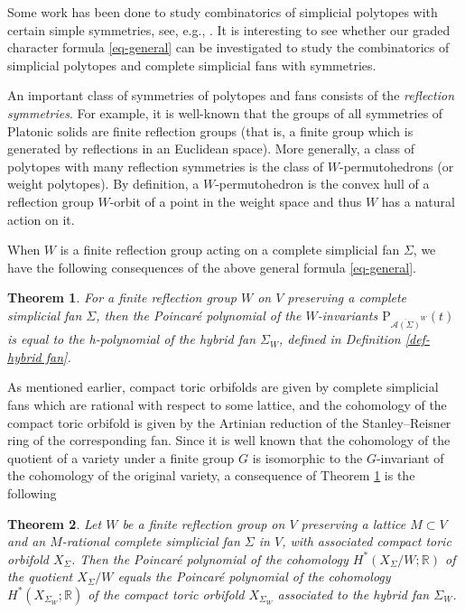\documentclass{amsart}
\newtheorem{theorem}{Theorem}[section]
\theoremstyle{definition}
\theoremstyle{remark}
\numberwithin{equation}{section}
\begin{document}
Some work has been done to study combinatorics of simplicial polytopes with certain simple symmetries, see, e.g., \cite{stanley1987number,adin1995face,jorge2003combinatorics}. It is interesting to see whether our graded character formula \eqref{eq-general} can be investigated to study the combinatorics of simplicial polytopes and complete simplicial fans with symmetries.

An important class of symmetries of polytopes and fans consists of the \emph{reflection symmetries}. For example, it is well-known that the groups of all symmetries of Platonic solids are finite reflection groups (that is, a finite group which is generated by reflections in an Euclidean space)\cite{coxeter1973regular}. More generally, a class of polytopes with many reflection symmetries is the class of $W$-permutohedrons (or weight polytopes). By definition, a $W$-permutohedron is the convex hull of a reflection group $W$-orbit of a point in the weight space and thus $W$ has a natural action on it. 

When $W$ is a finite reflection group acting on a complete simplicial fan $\Sigma$, we have the following consequences of the above general formula \eqref{eq-general}.

\begin{theorem} \label{thm-ref}
For a finite reflection group $W$ on $V$ preserving a complete simplicial fan $\Sigma$, then the Poincar\'e polynomial of the $W$-invariants 
$\mathrm{P}_{\overline{\mathcal{A}(\Sigma)}^W}(t)$ is equal to the h-polynomial of the hybrid fan $\Sigma_W$, defined in Definition \ref{def-hybrid fan}.
\end{theorem}

As mentioned earlier, compact toric orbifolds are given by complete simplicial fans which are rational with respect to some lattice\cite[Theorem 3.1.9]{cox2024toric}, and the cohomology of the compact toric orbifold is given by the Artinian reduction of the Stanley--Reisner ring of the corresponding fan. Since it is well known that the cohomology of the quotient of a variety under a finite group $G$ is isomorphic to the $G$-invariant of the cohomology of the original variety, a consequence of Theorem \ref{thm-ref} is the following 

\begin{theorem} \label{thm-Poincare}
Let $W$ be a finite reflection group on $V$ preserving a lattice $M \subset V$ and an $M$-rational complete simplicial fan $\Sigma$ in $V$, with associated compact toric orbifold $X_\Sigma$. Then the Poincar\'e polynomial of the cohomology $H^*\left(X_\Sigma / W ; \mathbb{R}\right)$ of the quotient $X_\Sigma / W$ equals the Poincar\'e polynomial of the cohomology $H^*\left(X_{\Sigma_W}; \mathbb{R}\right)$ of the compact toric orbifold $X_{\Sigma_W}$ associated to the hybrid fan $\Sigma_W$.
\end{theorem}
\end{document}
